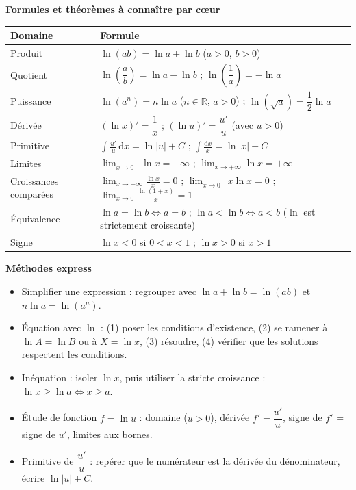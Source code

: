 \documentclass[11pt]{article}
\newcommand{\cle}[1]{{\popxbold\color{popdark}#1}}
\begin{document}
\begin{aretenir}
\textbf{Formules et théorèmes à connaître par cœur}
\begin{center}
\begin{tabularx}{\linewidth}{|l|X|}
\hline
\rowcolor{popblueL} \textbf{Domaine} & \textbf{Formule} \\
\hline
Produit & $\ln(ab) = \ln a + \ln b$ \quad ($a>0$, $b>0$) \\
\hline
Quotient & $\ln\!\left(\dfrac{a}{b}\right) = \ln a - \ln b$ ; \quad $\ln\!\left(\dfrac{1}{a}\right) = -\ln a$ \\
\hline
Puissance & $\ln(a^n) = n\ln a$ \quad ($n\in\mathbb{R}$, $a>0$) ; \quad $\ln(\sqrt{a}) = \dfrac{1}{2}\ln a$ \\
\hline
Dérivée & $(\ln x)' = \dfrac{1}{x}$ ; \quad $(\ln u)' = \dfrac{u'}{u}$ (avec $u>0$) \\
\hline
Primitive & $\displaystyle\int \frac{u'}{u}\,\mathrm{d}x = \ln|u| + C$ ; \quad $\displaystyle\int \frac{\mathrm{d}x}{x} = \ln|x| + C$ \\
\hline
Limites & $\displaystyle\lim_{x\to 0^+}\ln x = -\infty$ ; \quad $\displaystyle\lim_{x\to +\infty}\ln x = +\infty$ \\
\hline
Croissances comparées & $\displaystyle\lim_{x\to +\infty}\frac{\ln x}{x} = 0$ ; \quad $\displaystyle\lim_{x\to 0^+} x\ln x = 0$ ; \quad $\displaystyle\lim_{x\to 0}\frac{\ln(1+x)}{x} = 1$ \\
\hline
Équivalence & $\ln a = \ln b \Leftrightarrow a = b$ ; \quad $\ln a < \ln b \Leftrightarrow a < b$ ($\ln$ est \cle{strictement croissante}) \\
\hline
Signe & $\ln x < 0$ si $0 < x < 1$ ; \quad $\ln x > 0$ si $x > 1$ \\
\hline
\end{tabularx}
\end{center}

\textbf{Méthodes express}
\begin{itemize}
  \item \cle{Simplifier} une expression : regrouper avec $\ln a + \ln b = \ln(ab)$ et $n\ln a = \ln(a^n)$.
  \item \cle{Équation} avec $\ln$ : (1) poser les conditions d'existence, (2) se ramener à $\ln A = \ln B$ ou à $X = \ln x$, (3) résoudre, (4) vérifier que les solutions respectent les conditions.
  \item \cle{Inéquation} : isoler $\ln x$, puis utiliser la stricte croissance : $\ln x \geq \ln a \Leftrightarrow x \geq a$.
  \item \cle{Étude de fonction} $f = \ln u$ : domaine ($u>0$), dérivée $f' = \dfrac{u'}{u}$, signe de $f'$ = signe de $u'$, limites aux bornes.
  \item \cle{Primitive} de $\dfrac{u'}{u}$ : repérer que le numérateur est la dérivée du dénominateur, écrire $\ln|u| + C$.
\end{itemize}
\end{aretenir}
\end{document}
